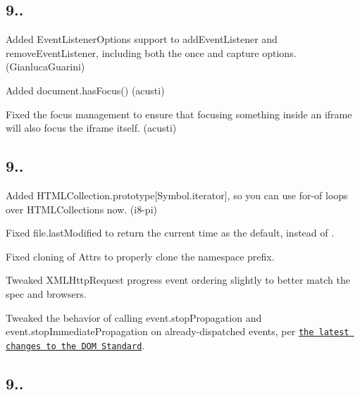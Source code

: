 \subsection*{9..}


\begin{DoxyItemize}
\item Added {\ttfamily Event\+Listener\+Options} support to {\ttfamily add\+Event\+Listener} and {\ttfamily remove\+Event\+Listener}, including both the {\ttfamily once} and {\ttfamily capture} options. (Gianluca\+Guarini)
\item Added {\ttfamily document.\+has\+Focus()} (acusti)
\item Fixed the focus management to ensure that focusing something inside an {\ttfamily iframe} will also focus the {\ttfamily iframe} itself. (acusti)
\end{DoxyItemize}

\subsection*{9..}


\begin{DoxyItemize}
\item Added {\ttfamily H\+T\+M\+L\+Collection.\+prototype\mbox{[}Symbol.\+iterator\mbox{]}}, so you can use {\ttfamily for}-\/{\ttfamily of} loops over {\ttfamily H\+T\+M\+L\+Collection}s now. (i8-\/pi)
\item Fixed {\ttfamily file.\+last\+Modified} to return the current time as the default, instead of {}.
\item Fixed cloning of {\ttfamily Attr}s to properly clone the namespace prefix.
\item Tweaked {\ttfamily X\+M\+L\+Http\+Request} progress event ordering slightly to better match the spec and browsers.
\item Tweaked the behavior of calling {\ttfamily event.\+stop\+Propagation} and {\ttfamily event.\+stop\+Immediate\+Propagation} on already-\/dispatched events, per \href{https://github.com/whatwg/dom/commit/806d4aab584f6fc38c21f8e088b51b8ba3e27e20}{\tt the latest changes to the D\+OM Standard}.
\end{DoxyItemize}

\subsection*{9..}


